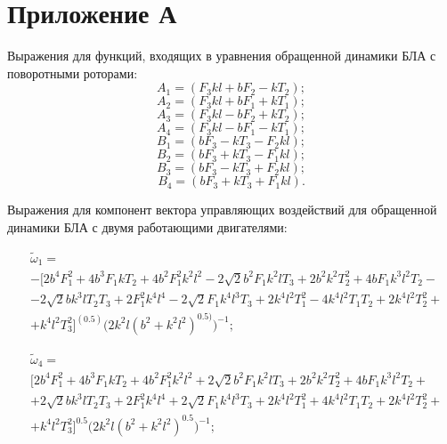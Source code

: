\chapter*{Приложение А}
\label{A}

Выражения для функций, входящих в уравнения обращенной динамики БЛА с поворотными роторами:
\begin{equation}
A_1 = (F_3kl + bF_2 - kT_2); \label{eq:app_solve_AB_begin}
\end{equation}
\begin{equation}
A_2 = (F_3kl + bF_1 + kT_1);
\end{equation}
\begin{equation}
A_3 = (F_3kl - bF_2 + kT_2);
\end{equation}
\begin{equation}
A_4 = (F_3kl - bF_1 - kT_1);
\end{equation}
\begin{equation}
B_1 = (bF_3 - kT_3 - F_2kl);
\end{equation}
\begin{equation}
B_2 = (bF_3 + kT_3 - F_1kl);
\end{equation}
\begin{equation}
B_3 = (bF_3 - kT_3 + F_2kl);
\end{equation}
\begin{equation}
B_4 = (bF_3 + kT_3 + F_1kl). \label{eq:app_solve_AB_end}
\end{equation}

Выражения для компонент вектора управляющих воздействий для обращенной динамики БЛА с двумя работающими двигателями: 

\begin{equation} \label{eq:app_em_solve_begin}
\begin{aligned}
&\tilde \omega_1 = \\&-\Big[2b^4F_1^2 + 4b^3F_1kT_2 + 4b^2F_1^2k^2l^2 - 2\sqrt{2}b^2F_1k^2lT_3 + 2b^2k^2T_2^2 + 4bF_1k^3l^2T_2 -\\ &-2\sqrt{2}bk^3lT_2T_3 + 2F_1^2k^4l^4 - 2\sqrt{2}F_1k^4l^3T_3 + 2k^4l^2T_1^2 - 4k^4l^2T_1T_2 + 2k^4l^2T_2^2 +\\ &+k^4l^2T_3^2 \Big]^{(0.5)} \Big(2k^2l(b^2 + k^2l^2)^{0.5)}\Big)^{-1};
\end{aligned}
\end{equation}

\begin{equation}
\begin{aligned}
&\tilde \omega_4 = \\&\Big[2b^4F_1^2 + 4b^3F_1kT_2 + 4b^2F_1^2k^2l^2 + 2\sqrt{2}b^2F_1k^2lT_3 + 2b^2k^2T_2^2 + 4bF_1k^3l^2T_2 + \\& +2\sqrt{2}bk^3lT_2T_3 + 2F_1^2k^4l^4 + 2\sqrt{2}F_1k^4l^3T_3 + 2k^4l^2T_1^2 + 4k^4l^2T_1T_2 + 2k^4l^2T_2^2 + \\& +k^4l^2T_3^2\Big]^{0.5} \Big(2k^2l(b^2 + k^2l^2)^{0.5}\Big)^{-1};
\end{aligned}
\end{equation}

